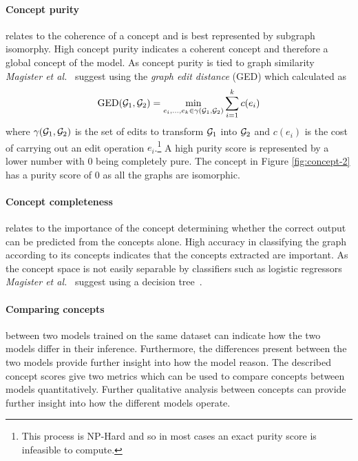 \paragraph{Concept purity}
relates to the coherence of a concept and is best represented by subgraph isomorphy.
High concept purity indicates a coherent concept and therefore a global concept of the model.
As concept purity is tied to graph similarity \textit{Magister et al.}~\cite{magister2021gcexplainer} suggest using the \emph{graph edit distance} (GED) which calculated as 
\begin{equation}
    \label{eq:GED}
    \operatorname{GED}({\mathcal{G}}_1, {\mathcal{G}}_2) = \underset{e_i,...,e_k \in \gamma({\mathcal{G}}_1, {\mathcal{G}}_2)}{\operatorname{min}} \sum_{i=1}^{k}c(e_i)
\end{equation}
where $\gamma({\mathcal{G}}_1, {\mathcal{G}}_2)$ is the set of edits to transform ${\mathcal{G}}_1$ into ${\mathcal{G}}_2$ and $c(e_i)$ is the cost of carrying out an edit operation $e_i$.\footnote{This process is NP-Hard and so in most cases an exact purity score is infeasible to compute.}
A high purity score is represented by a lower number with 0 being completely pure.
The concept in Figure \ref{fig:concept-2} has a purity score of 0 as all the graphs are isomorphic.

\paragraph{Concept completeness}
relates to the importance of the concept determining whether the correct output can be predicted from the concepts alone.
High accuracy in classifying the graph according to its concepts indicates that the concepts extracted are important.
As the concept space is not easily separable by classifiers such as logistic regressors \textit{Magister et al.}~\cite{magister2021gcexplainer} suggest using a decision tree~\cite{kazhdan2020now}.



\paragraph{Comparing concepts} between two models trained on the same dataset can indicate how the two models differ in their inference.
Furthermore, the differences present between the two models provide further insight into how the model reason.
The described concept scores give two metrics which can be used to compare concepts between models quantitatively.
Further qualitative analysis between concepts can provide further insight into how the different models operate.

